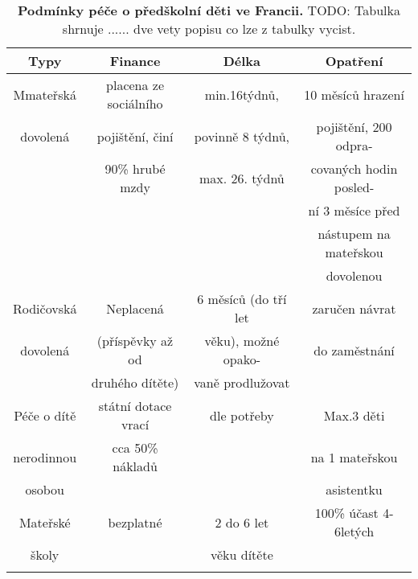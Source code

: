 		\begin{spacing}{1.0}
		\begin{table}[h]
			\small
			\begin{center}
			\begin{tabular}{|c|c|c|c|}
				\hline
				\rowcolor{grey}		
				\textbf{Typy}	&	\textbf{Finance} & 	\textbf{Délka} 	&	\textbf{Opatření} 	\\
				\hline
				\hline
				\rowcolor{grey!10}
				Mmateřská	&  placena ze sociálního &  min.16týdnů, 	 & 10 měsíců hrazení 		\\ \rowcolor{grey!10}
				dovolená 	& 	 pojištění, činí  	 & 	povinně 8 týdnů, & pojištění, 200 odpra- 	\\ \rowcolor{grey!10}
				 			& 	90\% hrubé mzdy 	 &  max. 26. týdnů 	 & covaných hodin posled- 	\\ \rowcolor{grey!10}
				 			&						 & 					 & ní 3 měsíce před 		\\ \rowcolor{grey!10}
				 			&						 &					 & nástupem na mateřskou 	\\ \rowcolor{grey!10}
				 			&						 & 					 & dovolenou 				\\ \rowcolor{grey!10}
				\hline
				Rodičovská	& Neplacená & 6 měsíců (do tří let 		& 	zaručen návrat 	\\ \rowcolor{grey!10}
				dovolená & (příspěvky až od & věku), možné opako-  	&  do zaměstnání	\\ \rowcolor{grey!10}
						 & druhého dítěte)  & vaně prodlužovat						&	\\ \rowcolor{grey!10}
				 \hline
				Péče o dítě	&	státní dotace vrací	&	dle potřeby	& Max.3 děti \\ \rowcolor{grey!10}
				nerodinnou 	&	cca 50\% nákladů 	&	& na 1 mateřskou 	\\ \rowcolor{grey!10}
				osobou 		& 						&	& asistentku		\\ \rowcolor{grey!10}
				\hline
				Mateřské 	&	bezplatné	& 2 do 6 let	& 100\% účast 4-6letých \\ \rowcolor{grey!10}
				školy 		& 	 			& věku dítěte	& 						\\ \rowcolor{grey!10}
				\hline
			\end{tabular}
			\end{center}
			\label{tab:peceFR}
			\caption{
				\textbf{Podmínky péče o předškolní děti ve Francii.}
				TODO: Tabulka shrnuje ...... dve vety popisu co lze z tabulky vycist.
			}
		\end{table}
		\end{spacing}

